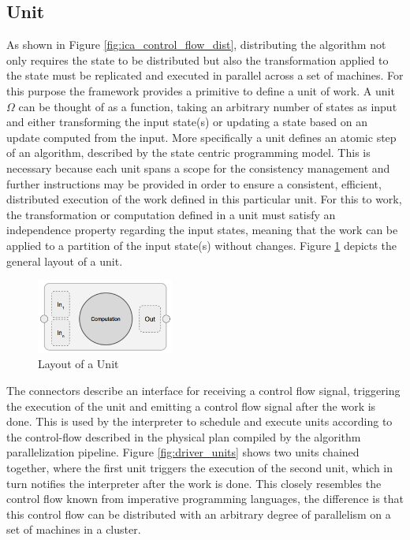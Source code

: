 \subsection{Unit}
\label{ss:unit}
As shown in Figure \ref{fig:ica_control_flow_dist}, distributing the algorithm not only requires the state to be distributed but also the transformation applied to the state must be replicated and executed in parallel across a set of machines.
For this purpose the framework provides a primitive to define a unit of work.
A unit $\Omega$ can be thought of as a function, taking an arbitrary number of states as input and either transforming the input state(s) or updating a state based on an update computed from the input.
More specifically a unit defines an atomic step of an algorithm, described by the state centric programming model.
This is necessary because each unit spans a scope for the consistency management and further instructions may be provided in order to ensure a consistent, efficient, distributed execution of the work defined in this particular unit.
For this to work, the transformation or computation defined in a unit must satisfy an independence property regarding the input states, meaning that the work can be applied to a partition of the input state(s) without changes.
Figure \ref{fig:unit} depicts the general layout of a unit.
\begin{figure}[ht]
\centering
\includegraphics[width=0.4\textwidth]{img/unit.png}
\caption{Layout of a Unit}
\label{fig:unit}
\end{figure}
The connectors describe an interface for receiving a control flow signal, triggering the execution of the unit and emitting a control flow signal after the work is done.
This is used by the interpreter to schedule and execute units according to the control-flow described in the physical plan compiled by the algorithm parallelization pipeline.
Figure \ref{fig:driver_units} shows two units chained together, where the first unit triggers the execution of the second unit, which in turn notifies the interpreter after the work is done.
This closely resembles the control flow known from imperative programming languages, the difference is that this control flow can be distributed with an arbitrary degree of parallelism on a set of machines in a cluster.
